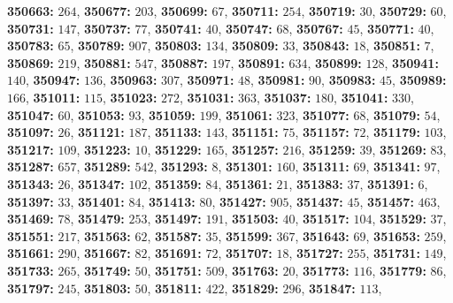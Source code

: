 \textsf{\bfseries 350663:} $264$, \textsf{\bfseries 350677:} $203$, \textsf{\bfseries 350699:} $67$, \textsf{\bfseries 350711:} $254$, \textsf{\bfseries 350719:} $30$, \textsf{\bfseries 350729:} $60$, \textsf{\bfseries 350731:} $147$, \textsf{\bfseries 350737:} $77$, \textsf{\bfseries 350741:} $40$, \textsf{\bfseries 350747:} $68$, \textsf{\bfseries 350767:} $45$, \textsf{\bfseries 350771:} $40$, \textsf{\bfseries 350783:} $65$, \textsf{\bfseries 350789:} $907$, \textsf{\bfseries 350803:} $134$, \textsf{\bfseries 350809:} $33$, \textsf{\bfseries 350843:} $18$, \textsf{\bfseries 350851:} $7$, \textsf{\bfseries 350869:} $219$, \textsf{\bfseries 350881:} $547$, \textsf{\bfseries 350887:} $197$, \textsf{\bfseries 350891:} $634$, \textsf{\bfseries 350899:} $128$, \textsf{\bfseries 350941:} $140$, \textsf{\bfseries 350947:} $136$, \textsf{\bfseries 350963:} $307$, \textsf{\bfseries 350971:} $48$, \textsf{\bfseries 350981:} $90$, \textsf{\bfseries 350983:} $45$, \textsf{\bfseries 350989:} $166$, \textsf{\bfseries 351011:} $115$, \textsf{\bfseries 351023:} $272$, \textsf{\bfseries 351031:} $363$, \textsf{\bfseries 351037:} $180$, \textsf{\bfseries 351041:} $330$, \textsf{\bfseries 351047:} $60$, \textsf{\bfseries 351053:} $93$, \textsf{\bfseries 351059:} $199$, \textsf{\bfseries 351061:} $323$, \textsf{\bfseries 351077:} $68$, \textsf{\bfseries 351079:} $54$, \textsf{\bfseries 351097:} $26$, \textsf{\bfseries 351121:} $187$, \textsf{\bfseries 351133:} $143$, \textsf{\bfseries 351151:} $75$, \textsf{\bfseries 351157:} $72$, \textsf{\bfseries 351179:} $103$, \textsf{\bfseries 351217:} $109$, \textsf{\bfseries 351223:} $10$, \textsf{\bfseries 351229:} $165$, \textsf{\bfseries 351257:} $216$, \textsf{\bfseries 351259:} $39$, \textsf{\bfseries 351269:} $83$, \textsf{\bfseries 351287:} $657$, \textsf{\bfseries 351289:} $542$, \textsf{\bfseries 351293:} $8$, \textsf{\bfseries 351301:} $160$, \textsf{\bfseries 351311:} $69$, \textsf{\bfseries 351341:} $97$, \textsf{\bfseries 351343:} $26$, \textsf{\bfseries 351347:} $102$, \textsf{\bfseries 351359:} $84$, \textsf{\bfseries 351361:} $21$, \textsf{\bfseries 351383:} $37$, \textsf{\bfseries 351391:} $6$, \textsf{\bfseries 351397:} $33$, \textsf{\bfseries 351401:} $84$, \textsf{\bfseries 351413:} $80$, \textsf{\bfseries 351427:} $905$, \textsf{\bfseries 351437:} $45$, \textsf{\bfseries 351457:} $463$, \textsf{\bfseries 351469:} $78$, \textsf{\bfseries 351479:} $253$, \textsf{\bfseries 351497:} $191$, \textsf{\bfseries 351503:} $40$, \textsf{\bfseries 351517:} $104$, \textsf{\bfseries 351529:} $37$, \textsf{\bfseries 351551:} $217$, \textsf{\bfseries 351563:} $62$, \textsf{\bfseries 351587:} $35$, \textsf{\bfseries 351599:} $367$, \textsf{\bfseries 351643:} $69$, \textsf{\bfseries 351653:} $259$, \textsf{\bfseries 351661:} $290$, \textsf{\bfseries 351667:} $82$, \textsf{\bfseries 351691:} $72$, \textsf{\bfseries 351707:} $18$, \textsf{\bfseries 351727:} $255$, \textsf{\bfseries 351731:} $149$, \textsf{\bfseries 351733:} $265$, \textsf{\bfseries 351749:} $50$, \textsf{\bfseries 351751:} $509$, \textsf{\bfseries 351763:} $20$, \textsf{\bfseries 351773:} $116$, \textsf{\bfseries 351779:} $86$, \textsf{\bfseries 351797:} $245$, \textsf{\bfseries 351803:} $50$, \textsf{\bfseries 351811:} $422$, \textsf{\bfseries 351829:} $296$, \textsf{\bfseries 351847:} $113$, 
